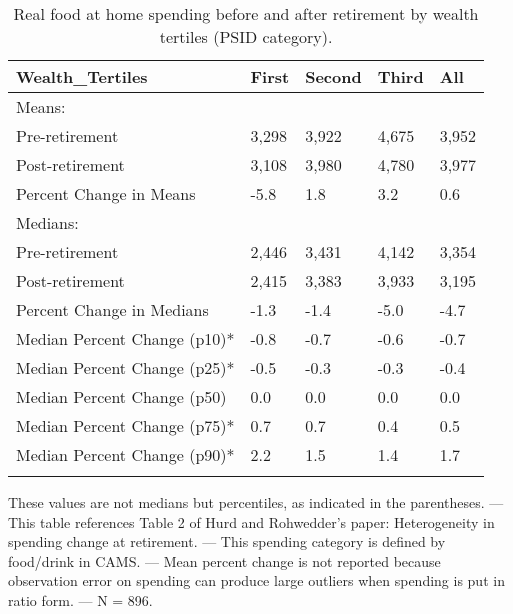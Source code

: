 \begin{table}[tbp] \centering
{}

\caption{Real food at home spending before and after retirement by wealth tertiles (PSID category).}
\begin{tabularx}{\textwidth}{lCCCC}

\toprule
{Wealth\_Tertiles}&{First}&{Second}&{Third}&{All} \tabularnewline
\midrule\addlinespace[1.5ex]
Means:&&&& \tabularnewline
\midrule Pre-retirement&3,298&3,922&4,675&3,952 \tabularnewline
Post-retirement&3,108&3,980&4,780&3,977 \tabularnewline
Percent Change in Means&-5.8&1.8&3.2&0.6 \tabularnewline
\midrule Medians:&&&& \tabularnewline
\midrule Pre-retirement&2,446&3,431&4,142&3,354 \tabularnewline
Post-retirement&2,415&3,383&3,933&3,195 \tabularnewline
Percent Change in Medians&-1.3&-1.4&-5.0&-4.7 \tabularnewline
Median Percent Change (p10)*&-0.8&-0.7&-0.6&-0.7 \tabularnewline
Median Percent Change (p25)*&-0.5&-0.3&-0.3&-0.4 \tabularnewline
Median Percent Change (p50)&0.0&0.0&0.0&0.0 \tabularnewline
Median Percent Change (p75)*&0.7&0.7&0.4&0.5 \tabularnewline
Median Percent Change (p90)*&2.2&1.5&1.4&1.7 \tabularnewline
\bottomrule \addlinespace[1.5ex]

\end{tabularx}
\begin{flushleft}
\footnotesize *These values are not medians but percentiles, as indicated in the parentheses. \linebreak --- \linebreak This table references Table 2 of Hurd and Rohwedder's paper: Heterogeneity in spending change at retirement. \linebreak --- \linebreak This spending category is defined by food/drink in CAMS. \linebreak --- \linebreak Mean percent change is not reported because observation error on spending can produce large outliers when spending is put in ratio form. \linebreak --- \linebreak N = 896.
\end{flushleft}
\end{table}
